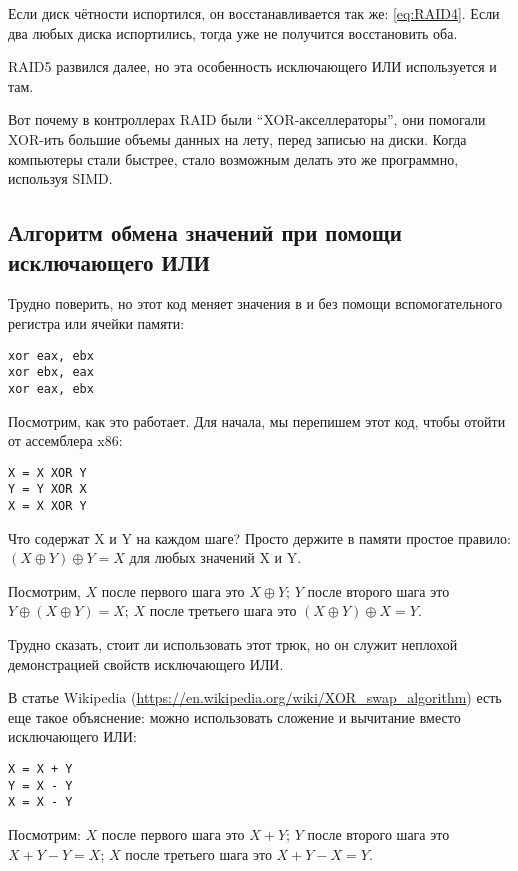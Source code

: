 Если диск чётности испортился, он восстанавливается так же: \ref{eq:RAID4}.
Если два любых диска испортились, тогда уже не получится восстановить оба.

\ac{RAID}5 развился далее, но эта особенность исключающего ИЛИ используется и там.

Вот почему в контроллерах \ac{RAID} были ``XOR-акселлераторы'', они помогали XOR-ить большие объемы данных
на лету, перед записью на диски.
Когда компьютеры стали быстрее, стало возможным делать это же программно, используя \ac{SIMD}.

\subsection{Алгоритм обмена значений при помощи исключающего ИЛИ}

Трудно поверить, но этот код меняет значения в \EAX и \EBX без помощи вспомогательного регистра или ячейки памяти:

\begin{lstlisting}[style=customasmx86]
xor eax, ebx
xor ebx, eax
xor eax, ebx
\end{lstlisting}

Посмотрим, как это работает.
Для начала, мы перепишем этот код, чтобы отойти от ассемблера x86:

\begin{lstlisting}
X = X XOR Y
Y = Y XOR X
X = X XOR Y
\end{lstlisting}

Что содержат X и Y на каждом шаге?
Просто держите в памяти простое правило: $(X \oplus Y) \oplus Y = X$ для любых значений X и Y.

Посмотрим,
$X$ после первого шага это $X \oplus Y$;
$Y$ после второго шага это $Y \oplus (X \oplus Y) = X$;
$X$ после третьего шага это $(X \oplus Y) \oplus X = Y$.

Трудно сказать, стоит ли использовать этот трюк, но он служит неплохой демонстрацией свойств исключающего ИЛИ.

В статье Wikipedia (\url{https://en.wikipedia.org/wiki/XOR_swap_algorithm}) есть еще такое объяснение:
можно использовать сложение и вычитание вместо исключающего ИЛИ:

\begin{lstlisting}
X = X + Y
Y = X - Y
X = X - Y
\end{lstlisting}

Посмотрим:
$X$ после первого шага это $X+Y$;
$Y$ после второго шага это $X+Y-Y=X$;
$X$ после третьего шага это $X+Y-X=Y$.

